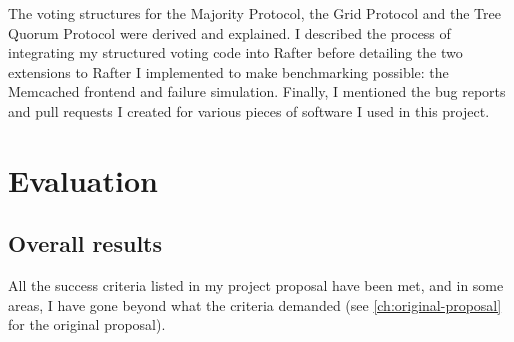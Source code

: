 \documentclass[12pt,chapterprefix=true,toc=bibliography,numbers=noendperiod,
               footnotes=multiple,twoside]{scrreprt}
\begin{document}
The voting structures for the Majority Protocol, the Grid Protocol and the Tree Quorum Protocol were derived and explained. I described the process of integrating my structured voting code into Rafter before detailing the two extensions to Rafter I implemented to make benchmarking possible: the Memcached frontend and failure simulation. Finally, I mentioned the bug reports and pull requests I created for various pieces of software I used in this project.



\chapter{Evaluation}
\label{ch:evaluation}



\section{Overall results}
\label{sc:overall-results}

All the success criteria listed in my project proposal have been met, and in some areas, I have gone beyond what the criteria demanded (see \cref{ch:original-proposal} for the original proposal).
\end{document}
